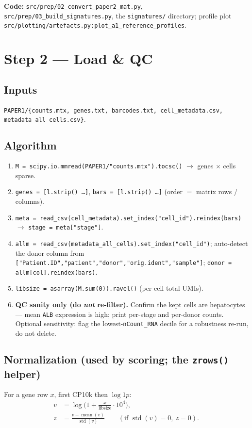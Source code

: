 \documentclass[11pt]{article}
\newcommand{\code}[1]{\texttt{\small #1}}
\begin{document}
\medskip
\noindent\textbf{Code:} \code{src/prep/02\_convert\_paper2\_mat.py},
\code{src/prep/03\_build\_signatures.py}, the \code{signatures/} directory;
profile plot \code{src/plotting/artefacts.py:plot\_a1\_reference\_profiles}.

\section{Step 2 --- Load \& QC}

\subsection{Inputs}
\code{PAPER1/\{counts.mtx, genes.txt, barcodes.txt, cell\_metadata.csv, metadata\_all\_cells.csv\}}.

\subsection{Algorithm}
\begin{enumerate}[leftmargin=1.6em]
  \item \code{M = scipy.io.mmread(PAPER1/"counts.mtx").tocsc()} $\rightarrow$ genes $\times$ cells
        sparse.
  \item \code{genes = [l.strip() \ldots]}, \code{bars = [l.strip() \ldots]} (order $=$ matrix
        rows / columns).
  \item \code{meta = read\_csv(cell\_metadata).set\_index("cell\_id").reindex(bars)} $\rightarrow$
        \code{stage = meta["stage"]}.
  \item \code{allm = read\_csv(metadata\_all\_cells).set\_index("cell\_id")}; auto-detect the donor
        column from \code{["Patient.ID","patient","donor","orig.ident","sample"]};
        \code{donor = allm[col].reindex(bars)}.
  \item \code{libsize = asarray(M.sum(0)).ravel()} (per-cell total UMIs).
  \item \textbf{QC sanity only (do \emph{not} re-filter).} Confirm the kept cells are
        hepatocytes --- mean \code{ALB} expression is high; print per-stage and per-donor counts.
        Optional sensitivity: flag the lowest-\code{nCount\_RNA} decile for a robustness re-run,
        do not delete.
\end{enumerate}

\subsection{Normalization (used by scoring; the \code{zrows()} helper)}\label{sec:norm}
For a gene row $x$, first CP10k then $\log 1p$:
\begin{align}
  v   &= \log\!\Big(1 + \frac{x}{\text{libsize}} \cdot 10^4\Big), \\
  z   &= \frac{v - \operatorname{mean}(v)}{\operatorname{std}(v)}
         \qquad (\text{if } \operatorname{std}(v)=0,\ z=0).
\end{align}
\end{document}
